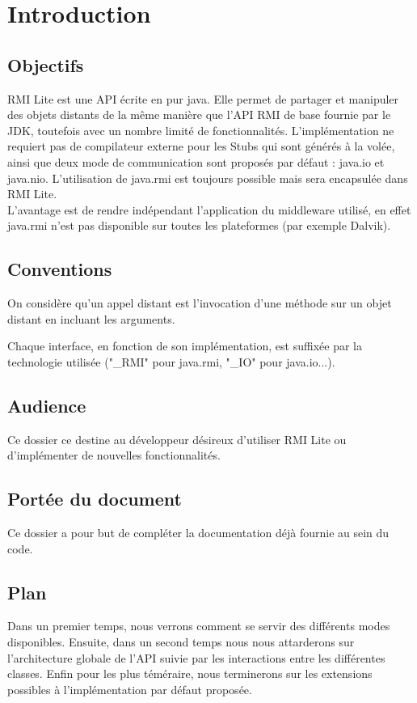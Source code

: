 \chapter{Introduction}

\section{Objectifs}

RMI Lite est une API écrite en pur java. Elle permet de partager et manipuler des objets distants de la même manière que l'API RMI de base fournie par le JDK, toutefois avec un nombre limité de fonctionnalités. L'implémentation ne requiert pas de compilateur externe pour les Stubs qui sont générés à la volée, ainsi que deux mode de communication sont proposés par défaut : java.io et java.nio. L'utilisation de java.rmi est toujours possible mais sera encapsulée dans RMI Lite.\\

L'avantage est de rendre indépendant l'application du middleware utilisé, en effet java.rmi n'est pas disponible sur toutes les plateformes (par exemple Dalvik).

\section{Conventions}
On considère qu'un appel distant est l'invocation d'une méthode sur un objet distant en incluant les arguments.
\medskip

Chaque interface, en fonction de son implémentation, est suffixée par la technologie utilisée ("\_RMI" pour java.rmi, "\_IO" pour java.io...).

\section{Audience}
Ce dossier ce destine au développeur désireux d'utiliser RMI Lite ou d'implémenter de nouvelles fonctionnalités.

\section{Portée du document}
Ce dossier a pour but de compléter la documentation déjà fournie au sein du code.

\section{Plan}
Dans un premier temps, nous verrons comment se servir des différents modes disponibles. Ensuite, dans un second temps nous nous attarderons sur l'architecture globale de l'API suivie par les interactions entre les différentes classes. Enfin pour les plus téméraire, nous terminerons sur les extensions possibles à l'implémentation par défaut proposée.

